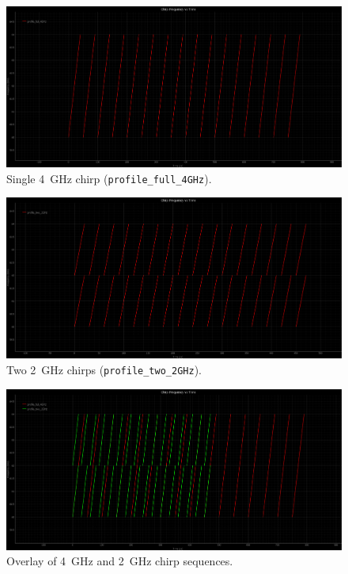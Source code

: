 \begin{figure}[!htbp]
    \centering
    \includegraphics[width=\linewidth]{images/profile4GHz.png}
    \caption{Single 4~GHz chirp (\texttt{profile\_full\_4GHz}).}
    \label{fig:profile4GHz}
\end{figure}

\begin{figure}[!htbp]
    \centering
    \includegraphics[width=\linewidth]{images/profile2GHz.png}
    \caption{Two 2~GHz chirps (\texttt{profile\_two\_2GHz}).}
    \label{fig:profile2GHz}
\end{figure}

\begin{figure}[!htbp]
    \centering
    \includegraphics[width=\linewidth]{images/profile2And4GHz.png}
    \caption{Overlay of 4~GHz and 2~GHz chirp sequences.}
    \label{fig:profile2And4GHz}
\end{figure}

